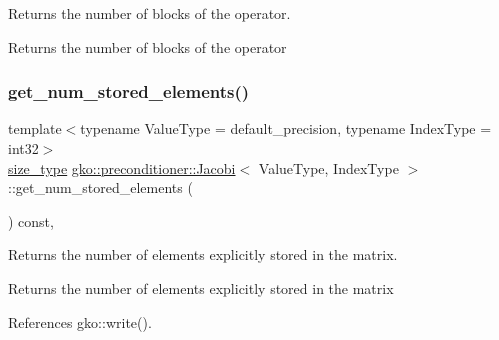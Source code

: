 Returns the number of blocks of the operator. 

\begin{DoxyReturn}{Returns}
the number of blocks of the operator 
\end{DoxyReturn}
\mbox{\label{classgko_1_1preconditioner_1_1Jacobi_af238130016f4534089edfb95918f14d1}} 
\subsubsection{\texorpdfstring{get\+\_\+num\+\_\+stored\+\_\+elements()}{get\_num\_stored\_elements()}}
{\footnotesize\ttfamily template$<$typename Value\+Type  = default\+\_\+precision, typename Index\+Type  = int32$>$ \\
\hyperlink{namespacegko_a6e5c95df0ae4e47aab2f604a22d98ee7}{size\+\_\+type} \hyperlink{classgko_1_1preconditioner_1_1Jacobi}{gko\+::preconditioner\+::\+Jacobi}$<$ Value\+Type, Index\+Type $>$\+::get\+\_\+num\+\_\+stored\+\_\+elements (\begin{DoxyParamCaption}{ }\end{DoxyParamCaption}) const\hspace{0.3cm}{\ttfamily [inline]}, {\ttfamily [noexcept]}}



Returns the number of elements explicitly stored in the matrix. 

\begin{DoxyReturn}{Returns}
the number of elements explicitly stored in the matrix 
\end{DoxyReturn}


References gko\+::write().

\mbox{\label{classgko_1_1preconditioner_1_1Jacobi_a5e4e792eebc837d555c2df4c74a3d5dc}} 
